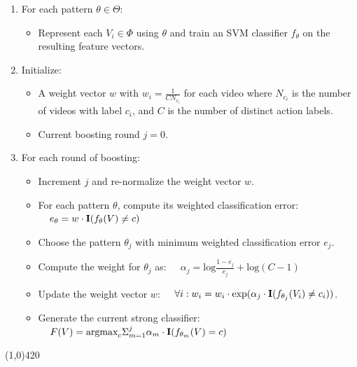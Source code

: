 \documentclass[12pt]{article} %
\begin{document}
      \begin{enumerate}
        \item For each pattern $\theta \in \Theta$:
          \begin{itemize}
            \item Represent each $V_i \in \Phi$ using $\theta$
            and train an SVM classifier $f_\theta$ on the
            resulting feature vectors.
          \end{itemize}

        \item Initialize:
          \begin{itemize}
            \item A weight vector $w$ with $w_i = \frac{1}{C N_{c_i}}$ for each video
              where
              $N_{c_i}$ is the number of videos with label $c_i$, and
              $C$ is the number of distinct action labels.
            \item Current boosting round $j=0$.
          \end{itemize}

        \item For each round of boosting:
          \begin{itemize}
            \item Increment $j$ and re-normalize the weight vector $w$.
            \item For each pattern $\theta$,
              compute its weighted classification error:
              $\;\;\;\;e_\theta = w \cdot \mbox{\textbf{I}}(f_\theta(V) \neq c)$
            \item Choose the pattern $\theta_j$ with minimum weighted
              classification error $e_j$.
            \item Compute the weight for $\theta_j$ as:
              $\;\;\;\;\alpha_j = \mbox{log} \frac{1 - e_j}{e_j} + \mbox{log}(C-1)$
            \item Update the weight vector $w$:
              $\;\;\;\;\forall i: w_i = w_i \cdot \mbox{exp}(\alpha_j \cdot
              \mbox{\textbf{I}}(f_{\theta_j}(V_i) \neq c_i))$.
            \item Generate the current strong classifier:
              $\;\;\;\;F(V) = \mbox{argmax}_c \Sigma_{m=1}^j \alpha_m \cdot
              \mbox{\textbf{I}}(f_{\theta_m}(V) = c)$
          \end{itemize}
      \end{enumerate}
  \line(1,0){420}\\
  \normalsize
  
\end{document}
